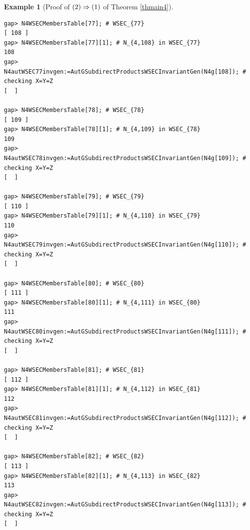 \documentclass{amsart}
\theoremstyle{plain}
\theoremstyle{definition}
\newtheorem{example}[theorem]{Example}
\theoremstyle{remark}
\begin{document}
\begin{example}[Proof of ${\rm (2)}\Rightarrow {\rm (1)}$ of {Theorem \ref{thmain4}}]
\begin{verbatim}
gap> N4WSECMembersTable[77]; # WSEC_{77}
[ 108 ]
gap> N4WSECMembersTable[77][1]; # N_{4,108} in WSEC_{77}
108
gap> N4autWSEC77invgen:=AutGSubdirectProductsWSECInvariantGen(N4g[108]); # checking X=Y=Z
[  ]

gap> N4WSECMembersTable[78]; # WSEC_{78}
[ 109 ]
gap> N4WSECMembersTable[78][1]; # N_{4,109} in WSEC_{78}
109
gap> N4autWSEC78invgen:=AutGSubdirectProductsWSECInvariantGen(N4g[109]); # checking X=Y=Z
[  ]

gap> N4WSECMembersTable[79]; # WSEC_{79}
[ 110 ]
gap> N4WSECMembersTable[79][1]; # N_{4,110} in WSEC_{79}
110
gap> N4autWSEC79invgen:=AutGSubdirectProductsWSECInvariantGen(N4g[110]); # checking X=Y=Z
[  ]

gap> N4WSECMembersTable[80]; # WSEC_{80}
[ 111 ]
gap> N4WSECMembersTable[80][1]; # N_{4,111} in WSEC_{80}
111
gap> N4autWSEC80invgen:=AutGSubdirectProductsWSECInvariantGen(N4g[111]); # checking X=Y=Z
[  ]

gap> N4WSECMembersTable[81]; # WSEC_{81}
[ 112 ]
gap> N4WSECMembersTable[81][1]; # N_{4,112} in WSEC_{81}
112
gap> N4autWSEC81invgen:=AutGSubdirectProductsWSECInvariantGen(N4g[112]); # checking X=Y=Z
[  ]

gap> N4WSECMembersTable[82]; # WSEC_{82}
[ 113 ]
gap> N4WSECMembersTable[82][1]; # N_{4,113} in WSEC_{82}
113
gap> N4autWSEC82invgen:=AutGSubdirectProductsWSECInvariantGen(N4g[113]); # checking X=Y=Z
[  ]


\end{verbatim}
\end{example}
\end{document}
